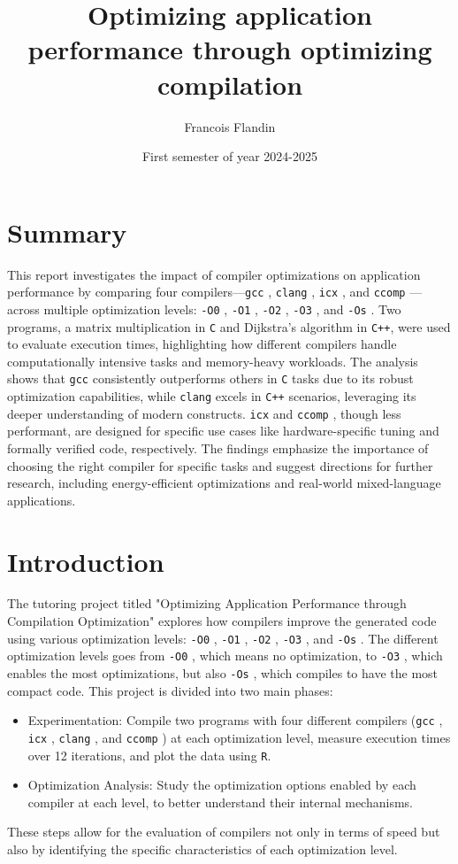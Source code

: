\documentclass{rapport}
\title{Optimizing application performance through optimizing compilation}
\author{Francois Flandin}
\date{First semester of year 2024-2025}
\newcommand{\gcc}{\texttt{gcc} }
\newcommand{\icx}{\texttt{icx} }
\newcommand{\clang}{\texttt{clang} }
\newcommand{\comp}{\texttt{ccomp} }
\newcommand{\optizero}{\texttt{-O0} }
\newcommand{\optione}{\texttt{-O1} }
\newcommand{\optitwo}{\texttt{-O2} }
\newcommand{\optithree}{\texttt{-O3} }
\newcommand{\optisize}{\texttt{-Os} }
\begin{document}
\maketitle


\clearpage
\tableofcontents

\clearpage
\section{Summary}
This report investigates the impact of compiler optimizations on application performance by comparing four compilers—\gcc, \clang, \icx, and \comp—across multiple optimization levels: 
\optizero, \optione, \optitwo, \optithree, and \optisize. 
\newline
Two programs, a matrix multiplication in \texttt{C} and Dijkstra’s algorithm in \texttt{C++}, were used to evaluate execution 
times, highlighting how different compilers handle computationally intensive tasks and memory-heavy workloads. 
\newline
The analysis shows that \gcc consistently outperforms others in \texttt{C}
tasks due to its robust optimization capabilities, while \clang excels in \texttt{C++} scenarios, leveraging its deeper understanding of modern constructs. \newline
\icx and \comp, though less performant, are designed for specific use cases like hardware-specific tuning and formally verified code, respectively. The findings emphasize the importance 
of choosing the right compiler for specific tasks and suggest directions for further research, including energy-efficient optimizations and real-world mixed-language applications.
\clearpage
\section{Introduction}
The tutoring project titled "Optimizing Application Performance through Compilation Optimization" explores how compilers improve the generated code 
using various optimization levels: \optizero, \optione, \optitwo, \optithree, and \optisize. \newline
The different optimization levels goes from \optizero, which means no optimization, to \optithree, which enables the most optimizations, but also \optisize, which
compiles to have the most compact code.\newline
This project is divided into two main phases:
\begin{itemize}
    \item Experimentation: Compile two programs with four different compilers (\gcc, \icx, \clang, and \comp) at each optimization level, 
    measure execution times over 12 iterations, and plot the data using \texttt{R}.
    \item Optimization Analysis: Study the optimization options enabled by each compiler at each level, to better understand their internal mechanisms.
\end{itemize}
These steps allow for the evaluation of compilers not only in terms of speed but also by identifying the specific characteristics of each optimization level.
\end{document}
